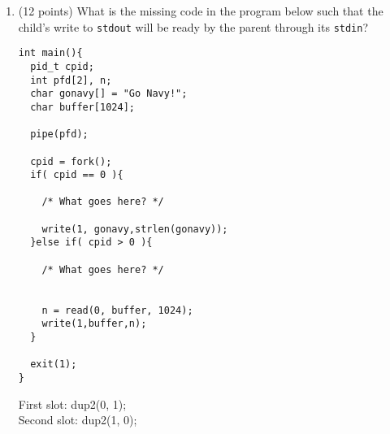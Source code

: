 \documentclass{article}[9pt]
\newenvironment{answerfont}{\fontfamily{qhv}\selectfont}{\par}
\newenvironment{myanswer}{\begin{mdframed}\begin{answerfont}}{\end{answerfont}\end{mdframed}}
\begin{document}
\begin{enumerate}
\begin{verbatim}
int main(){
  int fd_in = open("fight.txt",O_RDONLY);

  int fd_out = open("output.txt",O_WRONLY | O_TRUNC | O_CREAT,0755);
  char buf[1024];

  close(0);
  dup2(fd_in,0);

  close(1);
  dup2(fd_out,1);

  while(scanf("%s",buf) != EOF){
    printf("%s\n",buf);
  }

  return 0;
}
\end{verbatim}

  \begin{myanswer}
    The output file has the text line separated.  This is because stdin
    and stdout were duplicated into the new file descriptors for this
    problem.
  \end{myanswer}


\item (12 points) What is the missing code in the program below such that the
child's write to \texttt{stdout} will be ready by the parent through
its \texttt{stdin}?

\begin{verbatim}
int main(){
  pid_t cpid;
  int pfd[2], n;
  char gonavy[] = "Go Navy!";
  char buffer[1024];

  pipe(pfd);

  cpid = fork();
  if( cpid == 0 ){

    /* What goes here? */

    write(1, gonavy,strlen(gonavy));
  }else if( cpid > 0 ){

    /* What goes here? */


    n = read(0, buffer, 1024);
    write(1,buffer,n);
  }

  exit(1);
}
\end{verbatim}

  \begin{myanswer}
    First slot: dup2(0, 1);\\
    Second slot: dup2(1, 0);
  \end{myanswer}


\end{enumerate}
\end{document}
